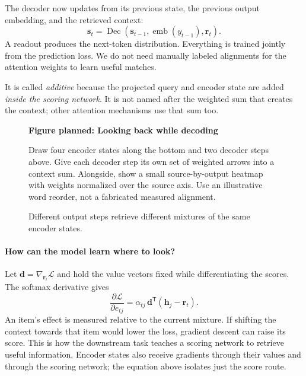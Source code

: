 \documentclass[11pt, oneside]{book}
\newcommand{\T}{^{\mathsf{T}}}           %
\newcommand{\loss}{\mathcal{L}}          %
\newcommand{\params}{\boldsymbol{\theta}}   %
\newcommand{\figureplaceholder}[5]{%
\begin{figure}[htbp]
\centering
\begin{tcolorbox}[unbreakable,width=\linewidth,height=#1,colback=accent!3,
  colframe=accent!30,boxrule=0.5pt,arc=2.5mm,sharp corners=all,
  valign=center,halign=center,fontupper=\small]
{\bfseries\color{accent}Figure planned: #2}\par\medskip
{\color{gray!75!black}#3}
\end{tcolorbox}
\caption{#4}\label{#5}
\end{figure}}
\begin{document}
The decoder now updates from its previous state, the previous output embedding, and the retrieved context:
\[
 \mathbf{s}_t=\operatorname{Dec}(\mathbf{s}_{t-1},\operatorname{emb}(y_{t-1}),\mathbf{r}_t).
\]
A readout produces the next-token distribution. Everything is trained jointly from the prediction loss. We do not need manually labeled alignments for the attention weights to learn useful matches.

It is called \emph{additive} because the projected query and encoder state are added \emph{inside the scoring network}. It is not named after the weighted sum that creates the context; other attention mechanisms use that sum too.

\figureplaceholder{3.8cm}{Looking back while decoding}{Draw four encoder states along the bottom and two decoder steps above. Give each decoder step its own set of weighted arrows into a context sum. Alongside, show a small source-by-output heatmap with weights normalized over the source axis. Use an illustrative word reorder, not a fabricated measured alignment.}{Different output steps retrieve different mixtures of the same encoder states.}{fig:attention-alignment}

\paragraph{How can the model learn where to look?} Let $\mathbf{d}=\nabla_{\mathbf{r}_t}\loss$ and hold the value vectors fixed while differentiating the scores. The softmax derivative gives
\begin{equation}
 \frac{\partial\loss}{\partial e_{tj}}
   =\alpha_{tj}\,\mathbf{d}\T(\mathbf{h}_j-\mathbf{r}_t).
 \label{eq:attention-score-gradient}
\end{equation}
An item's effect is measured relative to the current mixture. If shifting the context towards that item would lower the loss, gradient descent can raise its score. This is how the downstream task teaches a scoring network to retrieve useful information. Encoder states also receive gradients through their values and through the scoring network; the equation above isolates just the score route.
\end{document}
